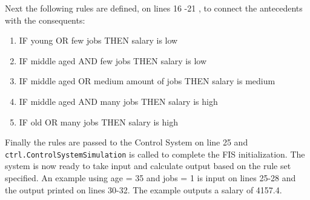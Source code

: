 Next the following rules are defined, on lines 16 -21 , to connect the antecedents with the consequents:

\begin{enumerate}[label=\textbf{Rule \arabic*},ref=Rule \arabic*]
    \item IF young  OR few jobs THEN salary is low
    \item IF middle aged  AND few jobs THEN salary is low
    \item IF middle aged  OR medium amount of  jobs THEN salary is medium
    \item IF middle aged  AND many jobs THEN salary is high
    \item IF old  OR many jobs THEN salary is high
\end{enumerate}

Finally the rules are passed to the Control System on line 25  and  \\ \texttt{ctrl.ControlSystemSimulation} is called to complete the FIS initialization.
The system is now ready to take input and calculate output based on the rule set specified. An example using age = 35 and jobs = 1 is input on lines 25-28 and the output printed on lines 30-32. The example outputs a salary of 4157.4.


